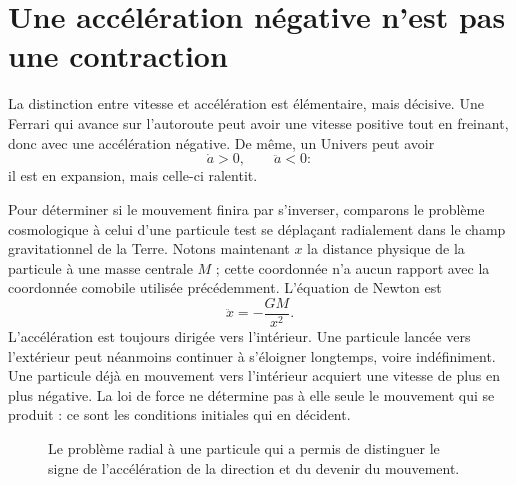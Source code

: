 \section{Une accélération négative n’est pas une contraction}

La distinction entre vitesse et accélération est élémentaire, mais décisive. Une Ferrari qui avance sur l’autoroute peut avoir une vitesse positive tout en freinant, donc avec une accélération négative. De même, un Univers peut avoir
\begin{equation}
\dot a>0,
\qquad
\ddot a<0:
\end{equation}
il est en expansion, mais celle-ci ralentit.

Pour déterminer si le mouvement finira par s’inverser, comparons le problème cosmologique à celui d’une particule test se déplaçant radialement dans le champ gravitationnel de la Terre. Notons maintenant \(x\) la distance physique de la particule à une masse centrale \(M\) ; cette coordonnée n’a aucun rapport avec la coordonnée comobile utilisée précédemment. L’équation de Newton est
\begin{equation}
\ddot x=-\frac{GM}{x^2}.
\label{eq:c01-particle-force}
\end{equation}
L’accélération est toujours dirigée vers l’intérieur. Une particule lancée vers l’extérieur peut néanmoins continuer à s’éloigner longtemps, voire indéfiniment. Une particule déjà en mouvement vers l’intérieur acquiert une vitesse de plus en plus négative. La loi de force ne détermine pas à elle seule le mouvement qui se produit : ce sont les conditions initiales qui en décident.

\begin{classroomqa}
\end{classroomqa}

\begin{figure}[ht]\centering
{}\caption{Le problème radial à une particule qui a permis de distinguer le signe de l’accélération de la direction et du devenir du mouvement.}\label{fig:c01-particle-sketch}\end{figure}

